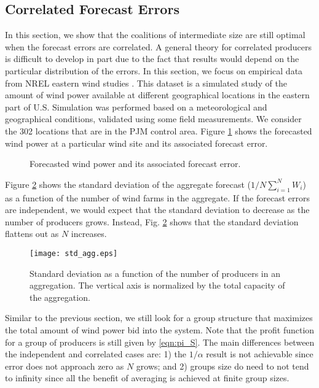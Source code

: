 \documentclass[journal]{IEEEtran}
\begin{document}
\subsection{Correlated Forecast Errors}
In this section, we show that the coalitions of intermediate size are still optimal when the forecast errors are correlated. A general theory for correlated producers is difficult to develop in part due to the fact that results would depend on the particular distribution of the errors. In this section, we focus on empirical data from NREL eastern wind studies \cite{NRELeastern}. This dataset is a simulated study of the amount of wind power available at different geographical locations in the eastern part of U.S. Simulation was performed based on a meteorological and geographical conditions, validated using some field measurements. We consider the 302 locations that are in the PJM control area.  Figure \ref{fig:error} shows the forecasted wind power at a particular wind site and its associated forecast error. 
\begin{figure}[t!]
\centering
{} 
\caption{Forecasted wind power and its associated forecast error.}
\label{fig:error}
\end{figure}

Figure \ref{fig:correlation} shows the standard deviation of the aggregate forecast ($1/N \sum_{i=1}^N W_i$) as a function of the number of wind farms in the aggregate. If the forecast errors are independent, we would expect that the standard deviation to decrease as the number of producers grows. Instead, Fig. \ref{fig:correlation} shows that the standard deviation flattens out as $N$ increases.
\begin{figure}[ht]
\centering
\texttt{[image: std\_agg.eps]}
\caption{Standard deviation as a function of the number of producers in an aggregation. The vertical axis is normalized by the total capacity of the aggregation.}
\label{fig:correlation}
\end{figure}

Similar to the previous section, we still look for a group structure that maximizes the total amount of wind power bid into the system. Note that the profit function for a group of producers is still given by \eqref{eqn:pi_S}. The main differences between the independent and correlated cases are: 1) the $1/\alpha$ result is not achievable since error does not approach zero as $N$ grows; and 2) groups size do need to not tend to infinity since all the benefit of averaging is achieved at finite group sizes.
\end{document}
